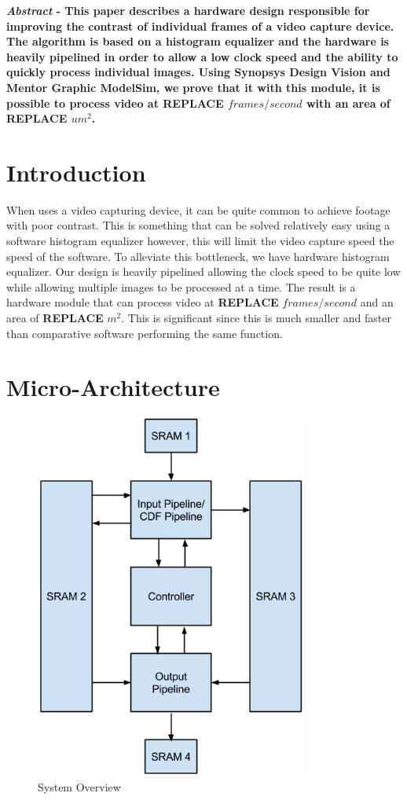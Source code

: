 \documentclass[12pt]{IEEEtran}
\begin{document}
\begin{flushleft}
\textbf{\emph{Abstract} - This paper describes a hardware design responsible for improving the contrast of individual frames of a video capture device. The algorithm is based on a histogram equalizer and the hardware is heavily pipelined in order to allow a low clock speed and the ability to quickly process individual images. Using Synopsys Design Vision and Mentor Graphic ModelSim, we prove that it with this module, it is possible to process video at \textbf{REPLACE} $frames/second$ with an area of \textbf{REPLACE} $um^{2}$.}
\end{flushleft}

\section{Introduction}

\begin{flushleft}
When uses a video capturing device, it can be quite common to achieve footage with poor contrast. This is something that can be solved relatively easy using a software histogram equalizer however, this will limit the video capture speed the speed of the software. To alleviate this bottleneck, we have hardware histogram equalizer. Our design is heavily pipelined allowing the clock speed to be quite low while allowing multiple images to be processed at a time. The result is a hardware module that can process video at \textbf{REPLACE} $frames/second$ and an area of \textbf{REPLACE} $m^{2}$. This is significant since this is much smaller and faster than comparative software performing the same function.
\end{flushleft}

\section{Micro-Architecture}

\begin{figure}[htb!]
	\includegraphics[width=90mm]{System_Overview.png}
	\caption{System Overview}
\end{figure}
\end{document}
